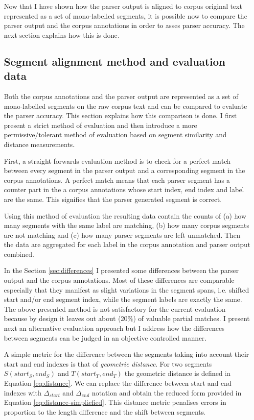     Now that I have shown how the parser output is aligned to corpus original text represented as a set of mono-labelled segments, it is possible now to compare the parser output and the corpus annotations in order to asses parser accuracy. The next section explains how this is done. 

\subsection{Segment alignment method and evaluation data}
\label{sec:alignment-algorithms}    

    Both the corpus annotations and the parser output are represented as a set of mono-labelled segments on the raw corpus text and can be compared to evaluate the parser accuracy. This section explains how this comparison is done. I first present a strict method of evaluation and then introduce a more permissive/tolerant  method of evaluation based on segment similarity and distance measurements. 

    First, a straight forwards evaluation method is to check for a perfect match between every segment in the parser output and a corresponding segment in the corpus annotations. A perfect match means that each parser segment has a counter part in the a corpus annotations whose start index, end index and label are the same. This signifies that the parser generated segment is correct.
    
    Using this method of evaluation the resulting data contain the counts of (a) how many segments with the same label are matching, (b) how many corpus segments are not matching and (c) how many parser segments are left unmatched. Then the data are aggregated for each label in the corpus annotation and parser output combined. 
    
    In the Section \ref{sec:differences} I presented some differences between the parser output and the corpus annotations. Most of these differences are comparable especially that they manifest as slight variations in the segment spans, i.e. shifted start and/or end segment index, while the segment labels are exactly the same. The above presented method is not satisfactory for the current evaluation because by design it leaves out about (20\%) of valuable partial matches. I present next an alternative evaluation approach but I address how the differences between segments can be judged in an objective  controlled manner.
    
    A simple metric for the difference between the segments taking into account their start and end indexes is that of \textit{geometric distance}. For two segments $S(start_S,end_S)$ and $T(start_T,end_T)$ the geometric distance is defined in Equation \ref{eq:distance}. We can replace the difference between start and end indexes with $\varDelta_{start}$ and $\varDelta_{end}$ notation and obtain the reduced form provided in Equation \ref{eq:distance-simpliefied}. This distance metric penalises errors in proportion to the length difference and the shift between segments. 
    
